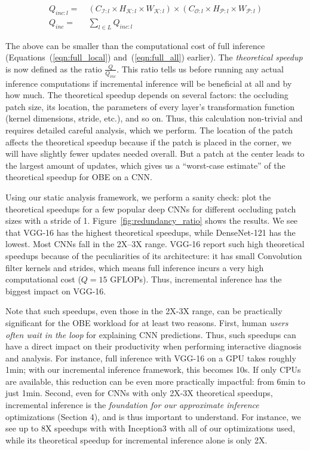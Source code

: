\begin{align}
\label{eqn:inc_local}
Q_{inc:l} =&~ (C_{\mathcal{I}:l} \times H_{\mathcal{K}:l} \times W_{\mathcal{K}:l}) \times (C_{\mathcal{O}:l} \times H_{\mathcal{P}:l} \times W_{\mathcal{P}:l})\\
\label{eqn:inc_all}
Q_{inc} =&~ \sum_{l \in L} Q_{inc:l}
\end{align}

The above can be smaller than the computational cost of full inference (Equations~(\ref{eqn:full_local}) and~(\ref{eqn:full_all}) earlier).
The \textit{theoretical speedup} is now defined as the ratio $\frac{Q}{Q_{inc}}$. This ratio tells us before running any actual inference computations 
if incremental inference will be beneficial at all and by how much.
The theoretical speedup depends on several factors: the occluding patch size, its location, the parameters of every layer's transformation function (kernel dimensions, stride, etc.), and so on. Thus, this calculation non-trivial and requires detailed careful analysis, which we perform.
The location of the patch affects the theoretical speedup because if the patch is placed in the corner, we will have slightly fewer updates needed overall. But a patch at the center leads to the largest amount of updates, which gives us a ``worst-case estimate'' of the theoretical speedup for OBE on a CNN.

Using our static analysis framework, we perform a sanity check: plot the theoretical speedups for a few popular deep CNNs for different occluding patch sizes with a stride of 1. Figure~\ref{fig:redundancy_ratio} shows the results. We see that VGG-16 has the highest theoretical speedups, while DenseNet-121 has the lowest. Most CNNs fall in the 2X--3X range. VGG-16 report such high theoretical speedups because of the peculiarities of its architecture: it has small Convolution filter kernels and strides, which means full inference incurs a very high computational cost ($Q = 15$ GFLOPs). Thus, incremental inference has the biggest impact on VGG-16. 

Note that such speedups, even those in the 2X-3X range, can be practically significant for the OBE workload for at least two reasons. First, human \textit{users often wait in the loop} for explaining CNN predictions. Thus, such speedups can have a direct impact on their productivity when performing interactive diagnosis and analysis. For instance, full inference with VGG-16 on a GPU takes roughly 1min; with our incremental inference framework, this becomes 10s. If only CPUs are available, this reduction can be even more practically impactful: from 6min to just 1min. Second, even for CNNs with only 2X-3X theoretical speedups, incremental inference is the \textit{foundation for our approximate inference} optimizations (Section 4), and is thus important to understand. For instance, we see up to 8X speedups with with Inception3 with all of our optimizations used, while its theoretical speedup for incremental inference alone is only 2X.

